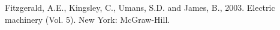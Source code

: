 \begin{thebibliography}{99}
 Fitzgerald, A.E., Kingsley, C., Umans, S.D. and James, B., 2003. Electric machinery (Vol. 5). New York: McGraw-Hill.
\end{thebibliography}

\pagebreak